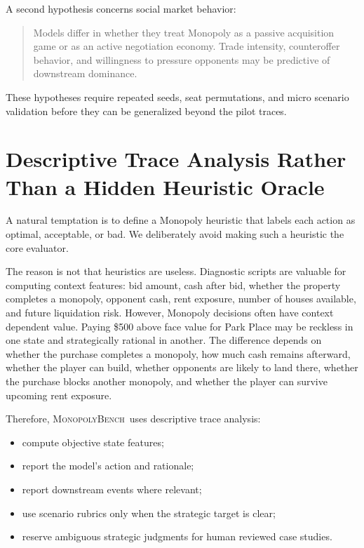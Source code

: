 \documentclass[conference]{IEEEtran}
\newcommand{\Bench}{\textsc{MonopolyBench}}
\begin{document}
A second hypothesis concerns social market behavior:

\begin{quote}
Models differ in whether they treat Monopoly as a passive acquisition game or as an active negotiation economy. Trade intensity, counteroffer behavior, and willingness to pressure opponents may be predictive of downstream dominance.
\end{quote}

These hypotheses require repeated seeds, seat permutations, and micro scenario validation before they can be generalized beyond the pilot traces.

\section{Descriptive Trace Analysis Rather Than a Hidden Heuristic Oracle}
\label{sec:no_heuristic_oracle}

A natural temptation is to define a Monopoly heuristic that labels each action as optimal, acceptable, or bad. We deliberately avoid making such a heuristic the core evaluator.

The reason is not that heuristics are useless. Diagnostic scripts are valuable for computing context features: bid amount, cash after bid, whether the property completes a monopoly, opponent cash, rent exposure, number of houses available, and future liquidation risk. However, Monopoly decisions often have context dependent value. Paying \$500 above face value for Park Place may be reckless in one state and strategically rational in another. The difference depends on whether the purchase completes a monopoly, how much cash remains afterward, whether the player can build, whether opponents are likely to land there, whether the purchase blocks another monopoly, and whether the player can survive upcoming rent exposure.

Therefore, \Bench\ uses descriptive trace analysis:

\begin{itemize}
    \item compute objective state features;
    \item report the model's action and rationale;
    \item report downstream events where relevant;
    \item use scenario rubrics only when the strategic target is clear;
    \item reserve ambiguous strategic judgments for human reviewed case studies.
\end{itemize}
\end{document}
